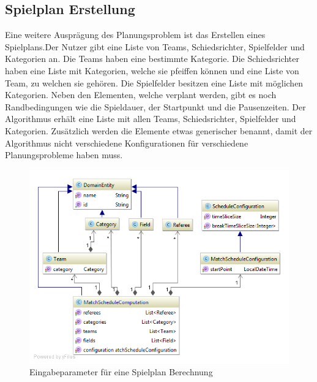 %
%
%
%

\subsection{Spielplan Erstellung}
Eine weitere Ausprägung des Planungsproblem ist das Erstellen eines Spielplans.Der Nutzer gibt eine Liste von Teams, Schiedsrichter, Spielfelder und Kategorien an. Die Teams haben eine 
bestimmte Kategorie. Die Schiedsrichter haben eine Liste mit Kategorien, welche sie pfeiffen können und eine Liste von Team, zu welchen sie gehören. Die Spielfelder besitzen eine Liste mit 
möglichen Kategorien. Neben den Elementen, welche verplant werden, gibt es noch Randbedingungen wie die Spieldauer, der Startpunkt und die Pausenzeiten. Der Algorithmus erhält eine 
Liste mit allen Teams, Schiedsrichter, Spielfelder und Kategorien. Zusätzlich werden die Elemente etwas generischer benannt, damit der Algorithmus nicht verschiedene Konfigurationen für 
verschiedene Planungsprobleme haben muss.

\begin{figure}[h]
\centering
\includegraphics[scale=0.5]{images/probleme/matchSchedule.png}
\caption[Eingabeparameter für eine Spielplan Berechnung]{Eingabeparameter für eine Spielplan Berechnung \selfmade{}}
\label{fig:matchschedule_input}
\end{figure}

